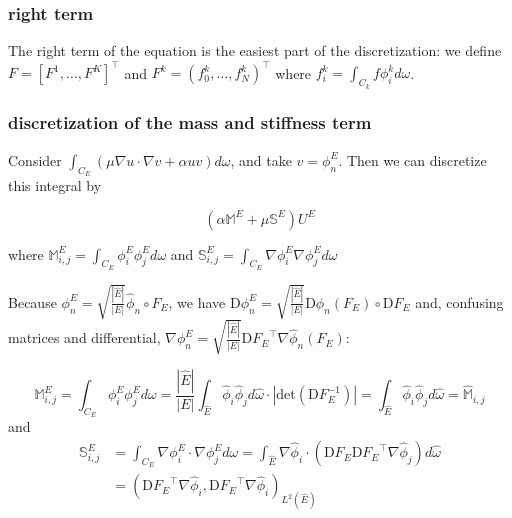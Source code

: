 \documentclass[a4paper,10pt,draft]{article}
\begin{document}
\subsubsection{right term}

The right term of the equation is the easiest part of the discretization: we define $F = [F^1, 
\dots , F^K]^\top$ and $F^k = 
(f_0^k, \dots , f_N^k)^\top$ where $f_i^k = \int_{C_k} f \phi_i^k d\omega$.



\subsubsection{discretization of the mass and stiffness term}

Consider $\int_{C_E} (\mu \nabla u  \cdot \nabla v + \alpha uv) d\omega$, and take $v = \phi_n^E$. 
Then 
we can discretize this integral by

\begin{equation}
 \left( \alpha \mathbb{M}^E + \mu \mathbb{S}^E  \right) U^E
\end{equation}

where $\mathbb{M}^E_{i,j} = \int_{C_E} \phi_i^E \phi_j^E d\omega$ and $\mathbb{S}_{i,j}^E =
\int_{C_E} \nabla \phi_i^E \nabla \phi_j^E d\omega$

Because $\phi_n^E = \sqrt{\frac{|\hat E|}{|E|}} \hat \phi_n \circ F_E$, we have 
$\mathrm{D}\phi_n^E = \sqrt{\frac{|\hat E|}{|E|}} \mathrm{D}\hat \phi_n(F_E) \circ \mathrm{D} F_E$ 
and, confusing matrices and differential, $\nabla \phi_n^E = \sqrt{\frac{|\hat E|}{|E|}} 
{\mathrm{D} F_E}^\top \nabla \hat \phi_n(F_E) $:

\begin{equation*}
 \mathbb{M}^E_{i,j} = \int_{C_E} \phi_i^E \phi_j^E d\omega = 
 \frac{|\hat E|}{|E|} \int_{\hat E} \hat \phi_i \hat \phi_j d\hat \omega \cdot 
|\mathrm{det}(\mathrm{D} F_E^{-1})| = 
\int_{\hat E} \hat \phi_i \hat \phi_j d\hat \omega =\widehat{\mathbb{M}}_{i,j}
\end{equation*}
and
\begin{align*}
 \mathbb{S}_{i,j}^E &= \int_{C_E} \nabla \phi_i^E \cdot \nabla \phi_j^E d\omega = 
\int_{\hat E} \nabla \hat \phi_i \cdot ( \mathrm{D} F_E{\mathrm{D} F_E}^\top \nabla \hat 
\phi_j) d\hat \omega \\
&= \left( {\mathrm{D} F_E}^\top \nabla \hat \phi_i , {\mathrm{D} F_E}^\top \nabla \hat \phi_i  
\right)_{L^2(\hat E)}
\end{align*}
\end{document}
